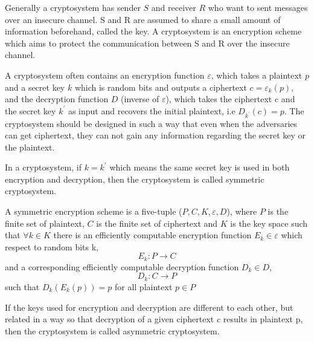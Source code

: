 Generally a cryptosystem has sender $S$ and receiver $R$ who want to sent messages over an insecure channel. S and R are assumed to share a small amount of information beforehand, called the key. A cryptosystem is an encryption scheme which aims to protect the communication between S and R over the insecure channel.

A cryptosystem often contains an encryption function $\varepsilon$, which takes a plaintext $p$ and a secret key $k$ which is random bits and outputs a ciphertext $c = \varepsilon_{k}(p)$, and the decryption function $D$ (inverse of $\varepsilon$), which takes the ciphertext c and the secret key $k^{'}$ as input and recovers the initial plaintext, i.e $D_{k^{'}}(c)=p$. The cryptosystem should be designed in such a way that even when the adversaries can get ciphertext, they can not gain any information regarding the secret key or the plaintext.

In a cryptosystem, if $k = k^{'}$ which means the same secret key is used in both encryption and decryption, then the cryptosystem is called symmetric cryptosystem.

\begin{mydef}
	A symmetric encryption scheme is a five-tuple ($P,C,K,\varepsilon, D$), where $P$ is the finite set of plaintext, $C$ is the finite set of ciphertext and $K$ is the key space such that $\forall k \in K$ there is an efficiently computable encryption function $E_{k} \in \varepsilon$ which respect to random bits k, 
	$$E_{k}:P \rightarrow C$$ 
	and a corresponding efficiently computable decryption function 
	$D_{k} \in D$, $$ D_{k} : C \rightarrow P$$ 
	such that $D_{k}(E_{k}(p)) = p$ for all plaintext $p \in P$
\end{mydef}

If the keys used for encryption and decryption are different to each other, but related in a way so that decryption of a given ciphertext $c$ results in plaintext p, then the cryptosystem is called asymmetric cryptosystem.

